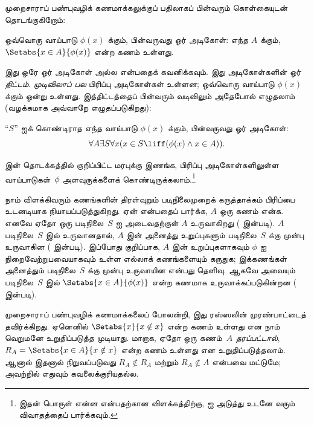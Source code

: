 \documentclass[../../../include/open-logic-section]{subfiles}
\begin{document}

முறைசாராப் பண்புவழிக் கணமாக்கலுக்குப் பதிலாகப் பின்வரும் கொள்கையுடன்
தொடங்குகிறோம்:

\begin{axiom}[பிரிப்பு அடிகோள் திட்டம்] ஒவ்வொரு வாய்பாடு $\phi(x)$ க்கும்,
பின்வருவது ஓர் அடிகோள்: எந்த $A$ க்கும்,
$\Setabs{x \in A}{\phi(x)}$ என்ற கணம் உள்ளது.
\end{axiom}

இது ஒரே ஓர் அடிகோள் அல்ல என்பதைக் கவனிக்கவும். இது அடிகோள்களின் ஓர்
\emph{திட்டம்}. \emph{முடிவிலாப் பல} பிரிப்பு அடிகோள்கள் உள்ளன;
ஒவ்வொரு வாய்பாடு $\phi(x)$ க்கும் ஒன்று உள்ளது. இத்திட்டத்தைப் பின்வரும்
வடிவிலும் அதேபோல் எழுதலாம் (வழக்கமாக அவ்வாறே எழுதப்படுகிறது):

\begin{defish}
``$S$'' ஐக் கொண்டிராத எந்த வாய்பாடு $\phi(x)$ க்கும், பின்வருவது ஓர்
அடிகோள்:
\[
	\forall A \exists S \forall x(x \in S \liff (\phi(x) \land x \in A)).
\]
\end{defish}

 இன் தொடக்கத்தில் குறிப்பிட்ட மரபுக்கு இணங்க,
பிரிப்பு அடிகோள்களிலுள்ள வாய்பாடுகள்~$\phi$ அளவுருக்களைக்
கொண்டிருக்கலாம்.\footnote{இதன் பொருள் என்ன என்பதற்கான விளக்கத்திற்கு,
 ஐ அடுத்து உடனே வரும்
விவாதத்தைப் பார்க்கவும்.}

நாம் விளக்கிவரும் கணங்களின் திரள்வுறும் படிநிலைமுறைக் கருத்தாக்கம்
பிரிப்பை உடனடியாக நியாயப்படுத்துகிறது. ஏன் என்பதைப் பார்க்க, $A$ ஒரு
கணம் என்க. எனவே ஏதோ ஒரு படிநிலை~$S$ ஐ அடைவதற்குள் $A$ உருவாகிறது
(\stageshier{} இன்படி). $A$ படிநிலை~$S$ இல் உருவானதால், $A$ இன் அனைத்து
உறுப்புகளும் படிநிலை~$S$ க்கு முன்பு உருவாகின (\stagesacc{} இன்படி).
இப்போது குறிப்பாக, $A$ இன் உறுப்புகளாகவும் $\phi$ ஐ நிறைவேற்றுபவையாகவும்
உள்ள எல்லாக் கணங்களையும் கருதுக; இக்கணங்கள் அனைத்தும் படிநிலை~$S$ க்கு
முன்பு உருவாயின என்பது தெளிவு. ஆகவே அவையும் படிநிலை~$S$ இல்
$\Setabs{x \in A}{\phi(x)}$ என்ற கணமாக உருவாக்கப்படுகின்றன
(\stagesacc{} இன்படி).

முறைசாராப் பண்புவழிக் கணமாக்கலைப் போலன்றி, இது ரஸ்ஸலின் முரண்பாட்டைத்
தவிர்க்கிறது. ஏனெனில் $\Setabs{x}{x \notin x}$ என்ற கணம் உள்ளது என நாம்
வெறுமனே உறுதிப்படுத்த முடியாது. மாறாக, ஏதோ ஒரு கணம்~$A$ \emph{தரப்பட்டால்},
$R_A = \Setabs{x \in A}{x \notin x}$ என்ற கணம் உள்ளது என
உறுதிப்படுத்தலாம். ஆனால் இதனால் நிறுவப்படுவது $R_A \notin R_A$ மற்றும்
$R_A \notin A$ என்பவை மட்டுமே; அவற்றில் எதுவும் கவலைக்குரியதல்ல.
\end{document}
